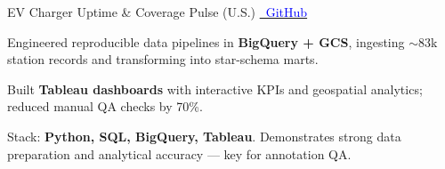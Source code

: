 \cventry
    {EV Charger Uptime \& Coverage Pulse (U.S.) 
    \href{https://github.com/Goku007007/ev-charger-uptime-snapshot}
       {\textcolor{blue}{\faGithub\ GitHub}}}
    {}
    {
      \begin{cvitems}
        \item {Engineered reproducible data pipelines in {\bf BigQuery + GCS}, ingesting $\sim$83k station records and transforming into star-schema marts.}
        \item {Built {\bf Tableau dashboards} with interactive KPIs and geospatial analytics; reduced manual QA checks by 70\%.}
        \item {Stack: {\bf Python, SQL, BigQuery, Tableau}. Demonstrates strong data preparation and analytical accuracy — key for annotation QA.}
      \end{cvitems}
    }




    



